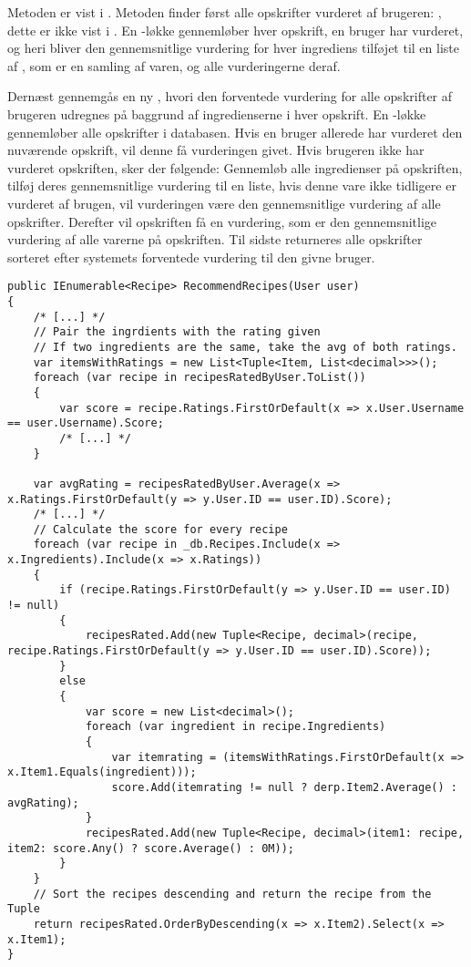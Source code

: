 Metoden  er vist i .
Metoden finder først alle opskrifter vurderet af brugeren: , dette er ikke vist i .
En -løkke gennemløber hver opskrift, en bruger har vurderet, og heri bliver den gennemsnitlige vurdering for hver ingrediens tilføjet til en liste af , som er en samling af varen, og alle vurderingerne deraf. 

Dernæst gennemgås en ny , hvori den forventede vurdering for alle opskrifter af brugeren udregnes på baggrund af ingredienserne i hver opskrift.
En -løkke gennemløber alle opskrifter i databasen. 
Hvis en bruger allerede har vurderet den nuværende opskrift, vil denne få vurderingen givet.
Hvis brugeren ikke har vurderet opskriften, sker der følgende: Gennemløb alle ingredienser på opskriften, tilføj deres gennemsnitlige vurdering til en liste, hvis denne vare ikke tidligere er vurderet af brugen, vil vurderingen være den gennemsnitlige vurdering af alle opskrifter. 
Derefter vil opskriften få en vurdering, som er den gennemsnitlige vurdering af alle varerne på opskriften.
Til sidste returneres alle opskrifter sorteret efter systemets forventede vurdering til den givne bruger.

\begin{lstlisting}[caption={Metoden \class{RecommendRecipes} sorterer opskrifter efter forventede vurdering for en given bruger.}, label=recommendrecipes]
public IEnumerable<Recipe> RecommendRecipes(User user)
{
    /* [...] */
    // Pair the ingrdients with the rating given
    // If two ingredients are the same, take the avg of both ratings.
    var itemsWithRatings = new List<Tuple<Item, List<decimal>>>();
    foreach (var recipe in recipesRatedByUser.ToList())
    {
        var score = recipe.Ratings.FirstOrDefault(x => x.User.Username == user.Username).Score;
        /* [...] */
    }

    var avgRating = recipesRatedByUser.Average(x => x.Ratings.FirstOrDefault(y => y.User.ID == user.ID).Score);
    /* [...] */
    // Calculate the score for every recipe
    foreach (var recipe in _db.Recipes.Include(x => x.Ingredients).Include(x => x.Ratings))
    {
        if (recipe.Ratings.FirstOrDefault(y => y.User.ID == user.ID) != null)
        {
            recipesRated.Add(new Tuple<Recipe, decimal>(recipe, recipe.Ratings.FirstOrDefault(y => y.User.ID == user.ID).Score));
        }
        else
        {
            var score = new List<decimal>();
            foreach (var ingredient in recipe.Ingredients)
            {
                var itemrating = (itemsWithRatings.FirstOrDefault(x => x.Item1.Equals(ingredient)));
                score.Add(itemrating != null ? derp.Item2.Average() : avgRating);
            }
            recipesRated.Add(new Tuple<Recipe, decimal>(item1: recipe, item2: score.Any() ? score.Average() : 0M));
        }
    }
    // Sort the recipes descending and return the recipe from the Tuple
    return recipesRated.OrderByDescending(x => x.Item2).Select(x => x.Item1);
}
\end{lstlisting}

